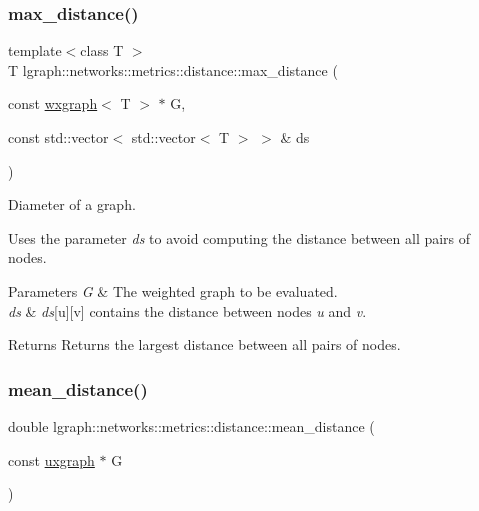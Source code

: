 \subsubsection{\texorpdfstring{max\+\_\+distance()}{max\_distance()}\hspace{0.1cm}{\footnotesize\ttfamily [4/4]}}
{\footnotesize\ttfamily template$<$class T $>$ \\
T lgraph\+::networks\+::metrics\+::distance\+::max\+\_\+distance (\begin{DoxyParamCaption}\item[{const \hyperlink{classlgraph_1_1wxgraph}{wxgraph}$<$ T $>$ $\ast$}]{G,  }\item[{const std\+::vector$<$ std\+::vector$<$ T $>$ $>$ \&}]{ds }\end{DoxyParamCaption})}



Diameter of a graph. 

Uses the parameter {\itshape ds} to avoid computing the distance between all pairs of nodes.


\begin{DoxyParams}{Parameters}
{\em G} & The weighted graph to be evaluated. \\
\hline
{\em ds} & {\itshape ds}\mbox{[}u\mbox{]}\mbox{[}v\mbox{]} contains the distance between nodes {\itshape u} and {\itshape v}. \\
\hline
\end{DoxyParams}
\begin{DoxyReturn}{Returns}
Returns the largest distance between all pairs of nodes. 
\end{DoxyReturn}
\mbox{\label{namespacelgraph_1_1networks_1_1metrics_1_1distance_ae0989fe3a9841ab45e373f00e4c7f4e0}} 
\subsubsection{\texorpdfstring{mean\+\_\+distance()}{mean\_distance()}\hspace{0.1cm}{\footnotesize\ttfamily [1/4]}}
{\footnotesize\ttfamily double lgraph\+::networks\+::metrics\+::distance\+::mean\+\_\+distance (\begin{DoxyParamCaption}\item[{const \hyperlink{classlgraph_1_1uxgraph}{uxgraph} $\ast$}]{G }\end{DoxyParamCaption})}




